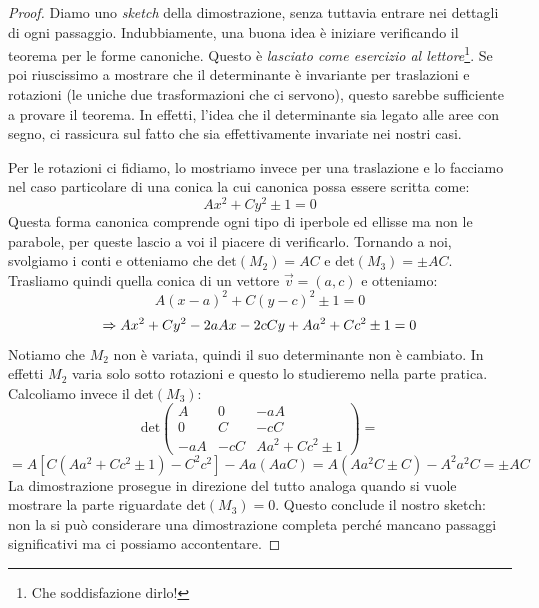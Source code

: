 \documentclass[a4paper, oneside]{article}
\begin{document}
		\begin{proof}
			Diamo uno \emph{sketch} della dimostrazione, senza tuttavia entrare nei dettagli di ogni passaggio. Indubbiamente, una buona idea è iniziare verificando il teorema per le forme canoniche. Questo è \emph{lasciato come esercizio al lettore}\footnote{Che soddisfazione dirlo!}.
			Se poi riuscissimo a mostrare che il determinante è invariante per traslazioni e rotazioni (le uniche due trasformazioni che ci servono), questo sarebbe sufficiente a provare il teorema. In effetti, l'idea che il determinante sia legato alle aree con segno, ci rassicura sul fatto che sia effettivamente invariate nei nostri casi.
			
			Per le rotazioni ci fidiamo, lo mostriamo invece per una traslazione e lo facciamo nel caso particolare di una conica la cui canonica possa essere scritta come:
			\begin{equation*}
				Ax^2+Cy^2\pm 1=0
			\end{equation*}
			Questa forma canonica comprende ogni tipo di iperbole ed ellisse ma non le parabole, per queste lascio a voi il piacere di verificarlo. Tornando a noi, svolgiamo i conti e otteniamo che $\mathrm{det}(M_2)=AC$ e $\mathrm{det}(M_3)=\pm AC$. Trasliamo quindi quella conica di un vettore $\overrightarrow{v}=(a,c)$ e otteniamo:
			\begin{equation*}
				A(x-a)^2+C(y-c)^2\pm 1=0
			\end{equation*}
			\begin{equation*}
				\Rightarrow Ax^2 + Cy^2 -2aAx -2cCy+Aa^2+Cc^2\pm 1=0
			\end{equation*}
			Notiamo che $M_2$ non è variata, quindi il suo determinante non è cambiato. In effetti $M_2$ varia solo sotto rotazioni e questo lo studieremo nella parte pratica.
			Calcoliamo invece il det$(M_3)$:
			\begin{equation*}
				\mathrm{det}\left(
				\begin{array}{ccc}
					A & 0 & -aA \\
					0 & C & -cC \\
					-aA & -cC & Aa^2+Cc^2\pm1
				\end{array} \right) =
			\end{equation*}
			\begin{equation*}
				= A[C(Aa^2+Cc^2\pm1)-C^2c^2]-Aa(AaC) = A(Aa^2C\pm C)-A^2a^2C = \pm AC
			\end{equation*}
			La dimostrazione prosegue in direzione del tutto analoga quando si vuole mostrare la parte riguardate det$(M_3)=0$. Questo conclude il nostro sketch: non la si può considerare una dimostrazione completa perché mancano passaggi significativi ma ci possiamo accontentare.
		\end{proof}
\end{document}
